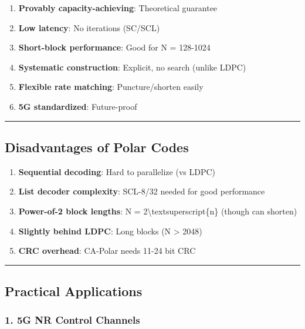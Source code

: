 \begin{enumerate}
\def\labelenumi{\arabic{enumi}.}
\tightlist
\item
  \textbf{Provably capacity-achieving}: Theoretical guarantee
\item
  \textbf{Low latency}: No iterations (SC/SCL)
\item
  \textbf{Short-block performance}: Good for N = 128-1024
\item
  \textbf{Systematic construction}: Explicit, no search (unlike LDPC)
\item
  \textbf{Flexible rate matching}: Puncture/shorten easily
\item
  \textbf{5G standardized}: Future-proof
\end{enumerate}

\begin{center}\rule{0.5\linewidth}{0.5pt}\end{center}

\subsection{Disadvantages of Polar
Codes}\label{disadvantages-of-polar-codes}

\begin{enumerate}
\def\labelenumi{\arabic{enumi}.}
\tightlist
\item
  \textbf{Sequential decoding}: Hard to parallelize (vs LDPC)
\item
  \textbf{List decoder complexity}: SCL-8/32 needed for good performance
\item
  \textbf{Power-of-2 block lengths}: N =
  2\textbackslash textsuperscript\{n\} (though can shorten)
\item
  \textbf{Slightly behind LDPC}: Long blocks (N \textgreater{} 2048)
\item
  \textbf{CRC overhead}: CA-Polar needs 11-24 bit CRC
\end{enumerate}

\begin{center}\rule{0.5\linewidth}{0.5pt}\end{center}

\subsection{Practical Applications}\label{practical-applications}

\subsubsection{1. 5G NR Control Channels}\label{g-nr-control-channels}

